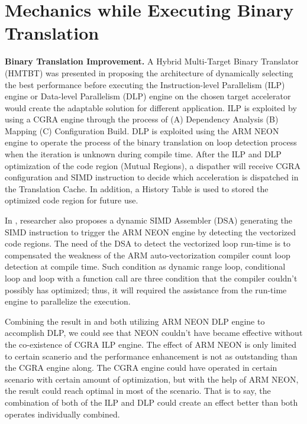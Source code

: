 \documentclass[sigconf, nonacm, natbib=false]{acmart}
\begin{document}
\section{Mechanics while Executing Binary Translation}
{\bf Binary Translation Improvement.} A Hybrid Multi-Target Binary Translator (HMTBT) was presented in \parencite{an_energy_efficient_multitarget} proposing the architecture of dynamically selecting the best performance before executing the Instruction-level Parallelism (ILP) engine or Data-level Parallelism (DLP) engine on the chosen target accelerator would create the adaptable solution for different application. ILP is exploited by using a CGRA engine through the process of (A) Dependency Analysis (B) Mapping (C) Configuration Build. DLP is exploited using the ARM NEON engine to operate the process of the binary translation on loop detection process when the iteration is unknown during compile time. After the ILP and DLP optimization of the code region (Mutual Regions), a dispather will receive CGRA configuration and SIMD instruction to decide which acceleration is dispatched in the Translation Cache. In addition, a History Table is used to stored the optimized code region for future use. 

In \parencite{exploiting_longer_simd}, researcher also proposes a dynamic SIMD Assembler (DSA) generating the SIMD instruction to trigger the ARM NEON engine by detecting the vectorized code regions. The need of the DSA to detect the vectorized loop run-time is to compensated the weakness of the ARM auto-vectorization compiler count loop detection at compile time. Such condition as dynamic range loop, conditional loop and loop with a function call are three condition that the compiler couldn't possibly has optimized; thus, it will required the assistance from the run-time engine to parallelize the execution. 

Combining the result in \parencite{exploiting_longer_simd} and \parencite{an_energy_efficient_multitarget} both utilizing ARM NEON DLP engine to accomplish DLP, we could see that NEON couldn't have became effective without the co-existence of CGRA ILP engine. The effect of ARM NEON is only limited to certain scanerio and the performance enhancement is not as outstanding than the CGRA engine along. The CGRA engine could have operated in certain scenario with certain amount of optimization, but with the help of ARM NEON, the result could reach optimal in most of the scenario. That is to say, the combination of both of the ILP and DLP could create an effect better than both operates individually combined. 
\end{document}
